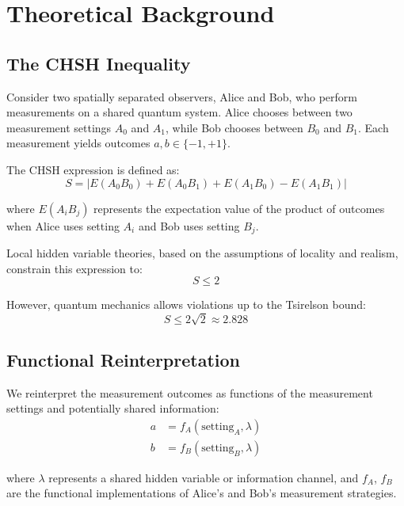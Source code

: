 \documentclass[11pt,a4paper]{article}
\begin{document}
\section{Theoretical Background}

\subsection{The CHSH Inequality}

Consider two spatially separated observers, Alice and Bob, who perform measurements on a shared quantum system. Alice chooses between two measurement settings $A_0$ and $A_1$, while Bob chooses between $B_0$ and $B_1$. Each measurement yields outcomes $a, b \in \{-1, +1\}$.

The CHSH expression is defined as:
\begin{equation}
S = |E(A_0B_0) + E(A_0B_1) + E(A_1B_0) - E(A_1B_1)|
\label{eq:chsh}
\end{equation}

where $E(A_iB_j)$ represents the expectation value of the product of outcomes when Alice uses setting $A_i$ and Bob uses setting $B_j$.

Local hidden variable theories, based on the assumptions of locality and realism, constrain this expression to:
\begin{equation}
S \leq 2
\label{eq:classical_bound}
\end{equation}

However, quantum mechanics allows violations up to the Tsirelson bound:
\begin{equation}
S \leq 2\sqrt{2} \approx 2.828
\label{eq:tsirelson_bound}
\end{equation}

\subsection{Functional Reinterpretation}

We reinterpret the measurement outcomes as functions of the measurement settings and potentially shared information:
\begin{align}
a &= f_A(\text{setting}_A, \lambda) \\
b &= f_B(\text{setting}_B, \lambda)
\end{align}

where $\lambda$ represents a shared hidden variable or information channel, and $f_A$, $f_B$ are the functional implementations of Alice's and Bob's measurement strategies.
\end{document}
